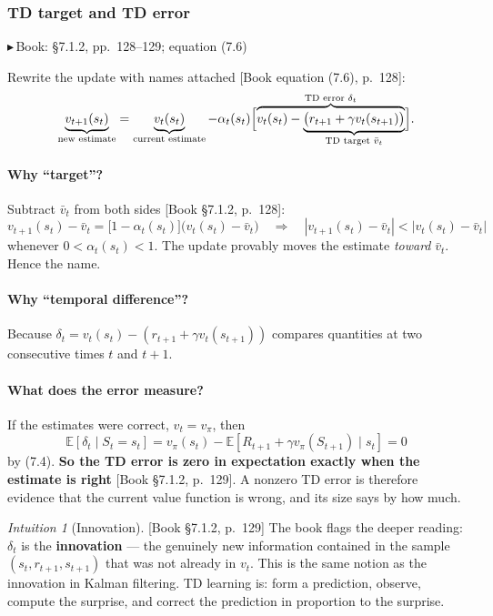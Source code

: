 \documentclass[11pt, letterpaper]{article}
\theoremstyle{runin}
\theoremstyle{runinplain}
\theoremstyle{remark}
\newtheorem*{intuition}{Intuition}
\newcommand{\E}{\mathbb{E}}
\newcommand{\abs}[1]{\left\lvert #1 \right\rvert}
\newcommand{\bk}[1]{{\color{bookblue}\small$\blacktriangleright$\,\textsf{Book: #1}}}
\newcommand{\bkin}[1]{{\color{bookblue}\small[\textsf{Book #1}]}}
\begin{document}
\subsubsection{TD target and TD error}

\bk{\S7.1.2, pp.~128--129; equation (7.6)}

Rewrite the update with names attached \bkin{equation (7.6), p.~128}:
\[
  \underbrace{v_{t+1}(s_t)}_{\text{new estimate}}
  =\underbrace{v_t(s_t)}_{\text{current estimate}}
   -\alpha_t(s_t)\Bigl[\overbrace{v_t(s_t)-\underbrace{\bigl(r_{t+1}+\gamma v_t(s_{t+1})\bigr)}_{\text{TD target }\bar v_t}}^{\text{TD error }\delta_t}\Bigr].
\]

\paragraph{Why ``target''?} Subtract $\bar v_t$ from both sides
\bkin{\S7.1.2, p.~128}:
\[
  v_{t+1}(s_t)-\bar v_t=\bigl[1-\alpha_t(s_t)\bigr]\bigl(v_t(s_t)-\bar v_t\bigr)
  \quad\Longrightarrow\quad
  \abs{v_{t+1}(s_t)-\bar v_t}<\abs{v_t(s_t)-\bar v_t}
\]
whenever $0<\alpha_t(s_t)<1$. The update provably moves the estimate \emph{toward}
$\bar v_t$. Hence the name.

\paragraph{Why ``temporal difference''?} Because
$\delta_t=v_t(s_t)-(r_{t+1}+\gamma v_t(s_{t+1}))$ compares quantities at two
consecutive times $t$ and $t+1$.

\paragraph{What does the error measure?} If the estimates were correct,
$v_t=v_\pi$, then
\[
  \E[\delta_t\mid S_t=s_t]
  =v_\pi(s_t)-\E[R_{t+1}+\gamma v_\pi(S_{t+1})\mid s_t]=0
\]
by (7.4). \textbf{So the TD error is zero in expectation exactly when the estimate
is right} \bkin{\S7.1.2, p.~129}. A nonzero TD error is therefore evidence that the
current value function is wrong, and its size says by how much.

\begin{intuition}[Innovation]
\bkin{\S7.1.2, p.~129} The book flags the deeper reading: $\delta_t$ is the
\textbf{innovation} --- the genuinely new information contained in the sample
$(s_t,r_{t+1},s_{t+1})$ that was not already in $v_t$. This is the same notion as
the innovation in Kalman filtering. TD learning is: form a prediction, observe,
compute the surprise, and correct the prediction in proportion to the surprise.
\end{intuition}
\end{document}
